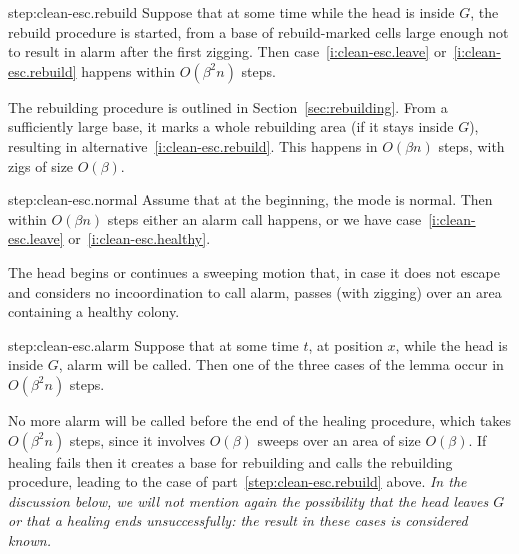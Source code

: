 \documentclass[12pt]{memoir}
\def\G{G}
\begin{document}
\begin{Proof}
\begin{step+}{step:clean-esc.rebuild}
Suppose that at some time while the head is inside \( \G \), the rebuild procedure is started,
from a base of rebuild-marked cells large enough not to result in alarm after the first zigging.
Then case~\eqref{i:clean-esc.leave} or~\eqref{i:clean-esc.rebuild} 
happens within \( O(\beta^{2} n) \) steps.
\end{step+}
\begin{pproof}
The rebuilding procedure is outlined in Section~\ref{sec:rebuilding}.
From a sufficiently large base, it 
marks a whole rebuilding area (if it stays inside \( G \)), resulting
in alternative~\eqref{i:clean-esc.rebuild}.
This happens in \( O(\beta n) \) steps, with zigs of size \( O(\beta) \).  
\end{pproof} %

\begin{step+}{step:clean-esc.normal}
Assume that at the beginning, the mode is normal.
Then within \( O(\beta n) \) steps either an alarm call happens, or we have 
case~\eqref{i:clean-esc.leave} or~\eqref{i:clean-esc.healthy}.
\end{step+}
\begin{pproof}
The head begins or continues a sweeping motion that, in case it does not escape
and considers no incoordination to call alarm,
passes (with zigging) over an area containing a healthy colony.
\end{pproof} %

\begin{step+}{step:clean-esc.alarm}
Suppose that at some time \( t \), at position \( x \),
while the head is inside \( \G \), alarm will be called.
Then one of the three cases of the lemma occur in \( O(\beta^{2} n) \) steps.
\end{step+}
\begin{pproof}
No more alarm will be called before the end of the healing procedure, which
takes \( O(\beta^{2} n) \) steps,
since it involves \( O(\beta) \) sweeps over an area of size \( O(\beta) \).
If healing fails then it creates a base for rebuilding and calls the rebuilding
procedure, leading to the case of part~\ref{step:clean-esc.rebuild} above.
\emph{In the discussion below, we will not mention again the possibility that the head
leaves \( G \) or that a healing ends unsuccessfully: the result in these cases is considered
known.}


\end{pproof}
\end{Proof}
\end{document}
